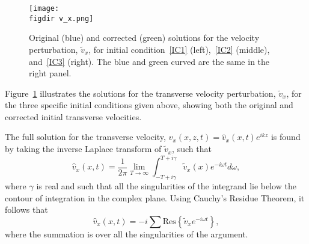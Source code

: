 \documentclass[12pt]{../style-files/ociamthesis}
\begin{document}
%
\begin{figure}
	\texttt{[image: \\figdir v\_x.png]}
	\caption{Original \cite{rae_etal81} (blue) and corrected (green) solutions for the velocity perturbation, $\tilde{v}_x$, for initial condition~\ref{IC1} (left),~\ref{IC2} (middle), and~\ref{IC3} (right). The blue and green curved are the same in the right panel.}
	\label{fig: vx}
\end{figure}
Figure~\ref{fig: vx} illustrates the solutions for the transverse velocity perturbation, $\tilde{v}_x$, for the three specific initial conditions given above, showing both the original and corrected initial transverse velocities.

The full solution for the transverse velocity, $v_x(x, z, t) = \hat{v}_x(x,t)e^{ikz}$ is found by taking the inverse Laplace transform of $\tilde{v}_x$, such that
\begin{equation}
\hat{v}_x(x,t) = \frac{1}{2\pi} \lim_{T \to \infty} \int_{-T+ i\gamma}^{T + i\gamma} \tilde{v}_x(x)e^{-i\omega t} d\omega,
\end{equation}
where $\gamma$ is real and such that all the singularities of the integrand lie below the contour of integration in the complex plane. Using Cauchy's Residue Theorem, it follows that
\begin{equation}
\hat{v}_x(x, t) = -i\sum \mathrm{Res}\left\{\tilde{v}_xe^{-i\omega t}\right\},
\end{equation}
where the summation is over all the singularities of the argument.
\end{document}
